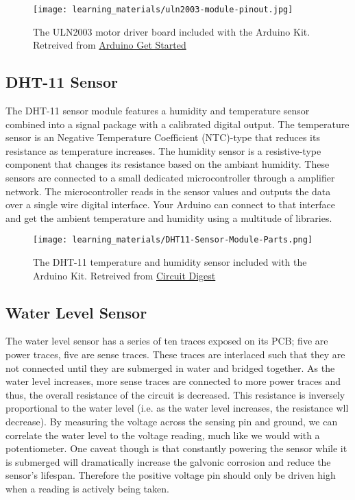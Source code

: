     \begin{figure}[h!]
        \texttt{[image: learning\_materials/uln2003-module-pinout.jpg]}
        \caption[Motor Driver]{The ULN2003 motor driver board included with the Arduino Kit. 
        Retreived from \href{https://arduinogetstarted.com/images/tutorial/uln2003-module-pinout.jpg}
        {Arduino Get Started}}
    \end{figure}

    \subsection*{DHT-11 Sensor}
    The DHT-11 sensor module features a humidity and temperature sensor combined into a signal package with a calibrated digital output.
    The temperature sensor is an Negative Temperature Coefficient (NTC)-type that reduces its resistance as temperature increases.
    The humidity sensor is a resistive-type component that changes its resistance based on the ambiant humidity.
    These sensors are connected to a small dedicated microcontroller through a amplifier network.
    The microcontroller reads in the sensor values and outputs the data over a single wire digital interface.
    Your Arduino can connect to that interface and get the ambient temperature and humidity using a multitude of libraries.
    
    \begin{figure}[h!]
        \texttt{[image: learning\_materials/DHT11-Sensor-Module-Parts.png]}
        \caption[DHT-11 Sensor]{The DHT-11 temperature and humidity sensor included with the Arduino Kit. 
        Retreived from \href{https://circuitdigest.com/sites/default/files/inlineimages/u4/DHT11-Sensor-Module-Parts.png}
        {Circuit Digest}}
    \end{figure}

    \subsection*{Water Level Sensor}
    The water level sensor has a series of ten traces exposed on its PCB; five are power traces, five are sense traces.
    These traces are interlaced such that they are not connected until they are submerged in water and bridged together.
    As the water level increases, more sense traces are connected to more power traces and thus, the overall resistance of the circuit is decreased.
    This resistance is inversely proportional to the water level (i.e. as the water level increases, the resistance wll decrease).
    By measuring the voltage across the sensing pin and ground, we can correlate the water level to the voltage reading, much like we would with a potentiometer.
    One caveat though is that constantly powering the sensor while it is submerged will dramatically increase the galvonic corrosion and reduce the sensor's lifespan.
    Therefore the positive voltage pin should only be driven high when a reading is actively being taken.

